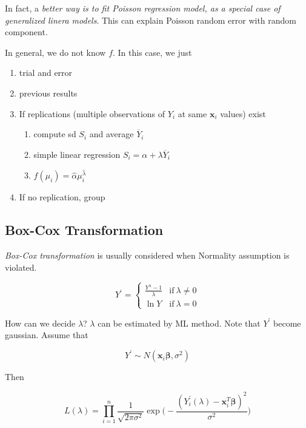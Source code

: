 \documentclass[]{book}
\providecommand{\tightlist}{%
  \setlength{\itemsep}{0pt}\setlength{\parskip}{0pt}}
\theoremstyle{definition}
\theoremstyle{definition}
\theoremstyle{definition}
\theoremstyle{remark}
\begin{document}
In fact, a \emph{better way is to fit Poisson regression model, as a special case of generalized linera models}. This can explain Poisson random error with random component.

In general, we do not know \(f\). In this case, we just

\begin{enumerate}
\def\labelenumi{\arabic{enumi}.}
\tightlist
\item
  trial and error
\item
  previous results
\item
  If replications (multiple observations of \(Y_i\) at same \(\mathbf{x}_i\) values) exist

  \begin{enumerate}
  \def\labelenumii{\arabic{enumii}.}
  \tightlist
  \item
    compute sd \(S_i\) and average \(\overline{Y}_i\)
  \item
    simple linear regression \(S_i = \alpha + \lambda \overline{Y}_i\)
  \item
    \(f(\mu_i) = \hat\alpha \mu_i^{\hat\lambda}\)
  \end{enumerate}
\item
  If no replication, group
\end{enumerate}

\hypertarget{box-cox-transformation}{%
\subsection{Box-Cox Transformation}\label{box-cox-transformation}}

\emph{Box-Cox transformation} is usually considered when Normality assumption is violated.

\[
Y^{\prime} = \begin{cases}
  \frac{Y^{\lambda} - 1}{\lambda} & \text{if}\: \lambda \neq 0 \\
  \ln Y & \text{if}\: \lambda = 0
\end{cases}
\]

How can we decide \(\lambda\)? \(\lambda\) can be estimated by ML method. Note that \(Y^{\prime}\) become gaussian. Assume that

\[Y^{\prime} \sim N(\mathbf{x}_i \boldsymbol\beta, \sigma^2)\]

Then

\[L(\lambda) = \prod_{i = 1}^n \frac{1}{\sqrt{2 \pi \sigma^2}} \exp \bigg( - \frac{(Y_i^{\prime}(\lambda) - \mathbf{x}_i^T \boldsymbol\beta)^2}{\sigma^2} \bigg)\]
\end{document}
